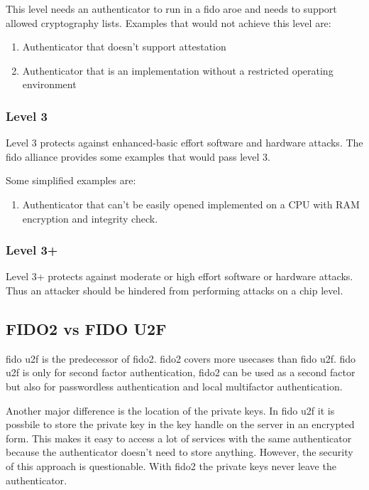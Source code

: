 \documentclass[a4paper, 11pt]{scrartcl}
\begin{document}
This level needs an authenticator to run in a \gls{fido} \gls{aroe} and needs to support allowed cryptography lists. Examples that would not achieve this level are\cite{fido:authenticator:level2, fido:authenticator:allowedEnvironment}:
\begin{enumerate}
  \item Authenticator that doesn't support attestation
  \item Authenticator that is an implementation without a restricted operating environment 
\end{enumerate}

\subsubsection{Level 3}
Level 3 protects against enhanced-basic effort software and hardware attacks. The \gls{fido} alliance provides some examples that would pass level 3\cite{fido:authenticator:level3}.

Some simplified examples are:
\begin{enumerate}
  \item Authenticator that can't be easily opened implemented on a CPU with RAM encryption and integrity check.
\end{enumerate}

\subsubsection{Level 3+}
Level 3+ protects against moderate or high effort software or hardware attacks. Thus an attacker should be hindered from performing attacks on a chip level\cite{fido:authenticator:level3_plus}.

\subsection{FIDO2 vs FIDO U2F}

\gls{fido} \gls{u2f} is the predecessor of \gls{fido2}. \gls{fido2} covers more usecases than \gls{fido} \gls{u2f}. \gls{fido} \gls{u2f} is only for second factor authentication, \gls{fido2} can be used as a second factor but also for passwordless authentication and local multifactor authentication\cite{yubico:whatIsFido2}.

Another major difference is the location of the private keys. In \gls{fido} \gls{u2f} it is possbile to store the private key in the key handle on the server in an encrypted form. This makes it easy to access a lot of services with the same authenticator because the authenticator doesn't need to store anything. However, the security of this approach is questionable. With \gls{fido2} the private keys never leave the authenticator\cite{fido:u2fImplementationConsiderations, fido:howitworks}.
\end{document}
